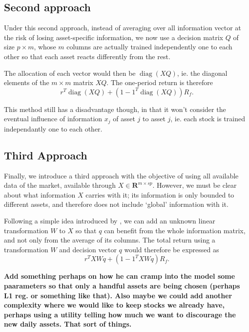 \documentclass[11pt]{article}
\DeclareMathOperator{\diag}{diag}
\newcommand{\real}{\bm R}
\theoremstyle{plain}
\theoremstyle{definition}
\begin{document}
\subsection{Second approach}

Under this second approach, instead of averaging over all information vector at the risk
of losing asset-specific information, we now use a decision matrix $Q$ of size $p\times
m$, whose $m$ columns are actually trained independently one to each other so that each
asset reacts differently from the rest. 

The allocation of each vector would then be $\diag(XQ)$, ie. the diagonal elements of the
$m\times{}m$ matrix $XQ$. The one-period return is therefore
\begin{equation}
  r^{T}\diag(XQ) + (1 - 1^{T}\diag(XQ))R_f.
\end{equation}

This method still has a disadvantage though, in that it won't consider the eventual
influence of information $x_j$ of asset $j$ to asset $j$, ie. each stock is trained
independantly one to each other.

\subsection{Third Approach}

Finally, we introduce a third approach with the objective of using all available data of
the market, available through $X\in\real^{m\times sp}$. However, we must be clear about
what information $X$ carries with it; its information is only bounded to different
assets, and therefore does not include `global' information with it.

Following a simple idea introduced by \cite{wsj}, we can add an unknown linear
transformation $W$ to $X$ so that $q$ can benefit from the whole information matrix, and
not only from the average of its columns. The total return using a transformation $W$ and
decision vector $q$ would therefore be expressed as
\begin{equation}
  r^{T}XWq + (1 - 1^{T}XWq)R_f.
\end{equation}

\textbf{Add something perhaps on how he can cramp into the model some paarameters so that
  only a handful assets are being chosen (perhaps L1 reg. or something like that).  Also
  maybe we could add another complexity where we would like to keep stocks we already
  have, perhaps using a utility telling how much we want to discourage the new daily
  assets. That sort of things.}
\end{document}
